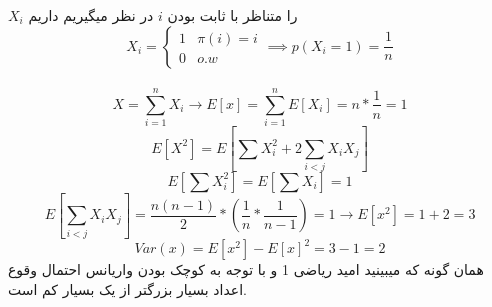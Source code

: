 
$X_i$ را متناظر با ثابت بودن $i$ در نظر میگیریم داریم\\
$$X_i =\begin{cases}
1 &\pi(i) = i\\
0  &o.w
\end{cases}\implies p(X_i = 1) = \frac{1}{n}$$
\\
$$X=\sum_{i=1}^{n}X_i \rightarrow E[x] = \sum_{i=1}^{n}E[X_i] = n * \frac{1}{n} = 1$$
$$E[X^2] = E[\sum X_i^2 + 2\sum_{i<j} X_iX_j]$$
$$E[\sum X_i^2] = E[\sum X_i] = 1$$
$$E[\sum_{i<j} X_iX_j] = \frac{n(n-1)}{2} * (\frac{1}{n}*\frac{1}{n-1}) = 1 \rightarrow E[x^2] = 1 + 2 = 3$$
$$Var(x) = E[x^2] - E[x]^2 = 3 - 1 = 2$$
همان گونه که میبینید امید ریاضی 1 و با توجه به کوچک بودن واریانس احتمال وقوع اعداد بسیار بزرگتر از یک بسیار کم است.